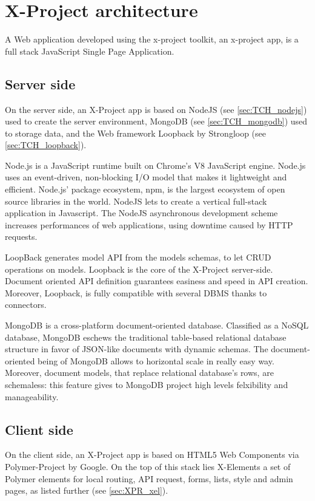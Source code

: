 \section{X-Project architecture}
\label{sec:XPR_arc}

A Web application developed using the x-project toolkit, an x-project app, is a full stack JavaScript Single Page Application.

\subsection{Server side}
\label{subsec:XPR_arc_serv}

On the server side, an X-Project app is based on NodeJS (see \ref{sec:TCH_nodejs}) used to create the server environment, MongoDB (see \ref{sec:TCH_mongodb}) used to storage data, and the Web framework Loopback by Strongloop (see \ref{sec:TCH_loopback}).

Node.js is a JavaScript runtime built on Chrome's V8 JavaScript engine. Node.js uses an event-driven, non-blocking I/O model that makes it lightweight and efficient. Node.js' package ecosystem, npm, is the largest ecosystem of open source libraries in the world. 
NodeJS lets to create a vertical full-stack application in Javascript. The NodeJS asynchronous development scheme increases performances of web applications, using downtime caused by HTTP requests.

LoopBack generates model API from the models schemas, to let CRUD operations on models.
Loopback is the core of the X-Project server-side. Document oriented API definition guarantees easiness and speed in API creation. Moreover, Loopback, is fully compatible with several DBMS thanks to connectors. 

MongoDB is a cross-platform document-oriented database. Classified as a NoSQL database, MongoDB eschews the traditional table-based relational database structure in favor of JSON-like documents with dynamic schemas.
The document-oriented being of MongoDB allows to horizontal scale in really easy way. Moreover, document models, that replace relational database's rows, are schemaless: this feature gives to MongoDB project high levels felxibility and manageability.


\subsection{Client side}
\label{subsec:XPR_arc_clie}

On the client side, an X-Project app is based on HTML5 Web Components via Polymer-Project by Google.
On the top of this stack lies X-Elements a set of Polymer elements for local routing, API request, forms, lists, style and admin pages, as listed further (see \ref{sec:XPR_xel}).


